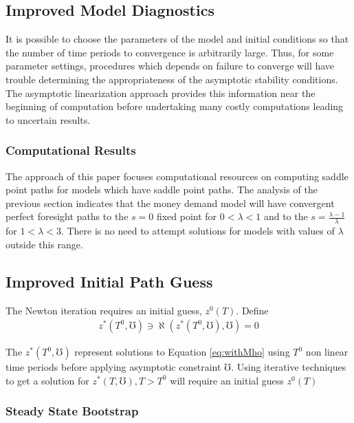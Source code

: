 \documentclass[12pt]{article}
\begin{document}
\subsection{Improved Model Diagnostics}

It is possible to choose the parameters of the model and initial conditions
so that the 
number of time periods to convergence  is arbitrarily large.
Thus, for some parameter settings,
procedures  which depends on failure to converge will have trouble
determining the appropriateness of the asymptotic stability conditions.
The asymptotic linearization approach provides this information  near the
beginning of computation
before undertaking many costly computations leading to uncertain results.

\subsubsection{Computational Results}
The approach of this paper focuses computational
resources on computing saddle point paths for models
which have saddle point paths.
The analysis of the previous section indicates that the money demand
model will have convergent perfect foresight paths to the 
$s=0$ fixed point for $0 < \lambda < 1$ and to the $s=\frac{\lambda-1}{\lambda}$
for $ 1 < \lambda < 3$. There is no need to attempt solutions for models
with values of $\lambda$ outside this range.

%



\subsection{Improved Initial Path Guess}
\label{sec:initGuess}

The Newton iteration requires an initial guess, $z^0(T)$.
Define
\begin{gather}
z^\ast(T^0,\mho) \ni \aleph(z^\ast(T^0,\mho),\mho)=0\label{eq:horizSoln}
\end{gather}

The $z^\ast(T^0,\mho)$ represent solutions to Equation \ref{eq:withMho}
using $T^0$ non linear time periods before applying asymptotic constraint
$\mho$.
Using iterative techniques to get a solution for  
$z^\ast(T,\mho), T> T^0$ will require an initial guess $z^0(T)$

\subsubsection{Steady State Bootstrap}
\end{document}
